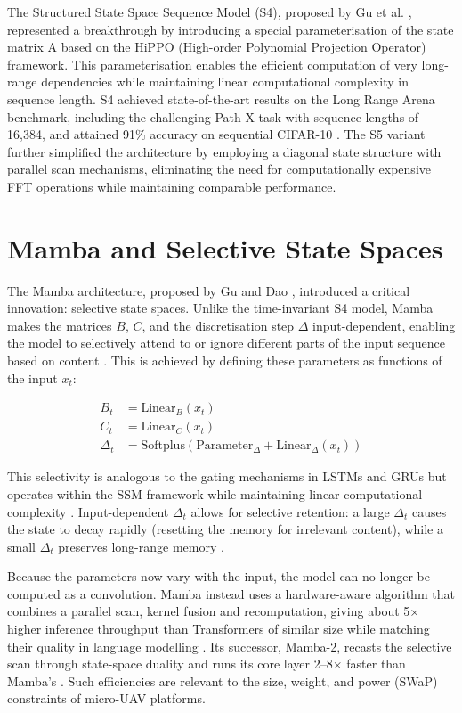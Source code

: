 \documentclass[11pt, a4paper]{report}
\begin{document}
The Structured State Space Sequence Model (S4), proposed by Gu et al. \cite{gu2022efficiently}, represented a breakthrough by introducing a special parameterisation of the state matrix A based on the HiPPO (High-order Polynomial Projection Operator) framework. This parameterisation enables the efficient computation of very long-range dependencies while maintaining linear computational complexity in sequence length. S4 achieved state-of-the-art results on the Long Range Arena benchmark, including the challenging Path-X task with sequence lengths of 16,384, and attained 91\% accuracy on sequential CIFAR-10 \cite{gu2022efficiently}. The S5 variant \cite{smith2023simplified} further simplified the architecture by employing a diagonal state structure with parallel scan mechanisms, eliminating the need for computationally expensive FFT operations while maintaining comparable performance. 

\section{Mamba and Selective State Spaces}
The Mamba architecture, proposed by Gu and Dao \cite{gu2023mamba}, introduced a critical innovation: selective state spaces. Unlike the time-invariant S4 model, Mamba makes the matrices $B$, $C$, and the discretisation step $\Delta$ input-dependent, enabling the model to selectively attend to or ignore different parts of the input sequence based on content \cite{gu2023mamba}. This is achieved by defining these parameters as functions of the input $x_t$:

\begin{align}
    B_t &= \text{Linear}_B(x_t) \\
    C_t &= \text{Linear}_C(x_t) \\
    \Delta_t &= \text{Softplus}(\text{Parameter}_\Delta + \text{Linear}_\Delta(x_t))
\end{align}

This selectivity is analogous to the gating mechanisms in LSTMs and GRUs but operates within the SSM framework while maintaining linear computational complexity \cite{gu2023mamba}. Input-dependent $\Delta_t$ allows for selective retention: a large $\Delta_t$ causes the state to decay rapidly (resetting the memory for irrelevant content), while a small $\Delta_t$ preserves long-range memory \cite{gu2023mamba, zubic2024state}. 

Because the parameters now vary with the input, the model can no longer be computed as a convolution. Mamba instead uses a hardware-aware algorithm that combines a parallel scan, kernel fusion and recomputation, giving about 5$\times$ higher inference throughput than Transformers of similar size while matching their quality in language modelling \cite{gu2023mamba}. Its successor, Mamba-2, recasts the selective scan through state-space duality and runs its core layer 2--8$\times$ faster than Mamba's \cite{dao2024transformers}. Such efficiencies are relevant to the size, weight, and power (SWaP) constraints of micro-UAV platforms.
\end{document}
